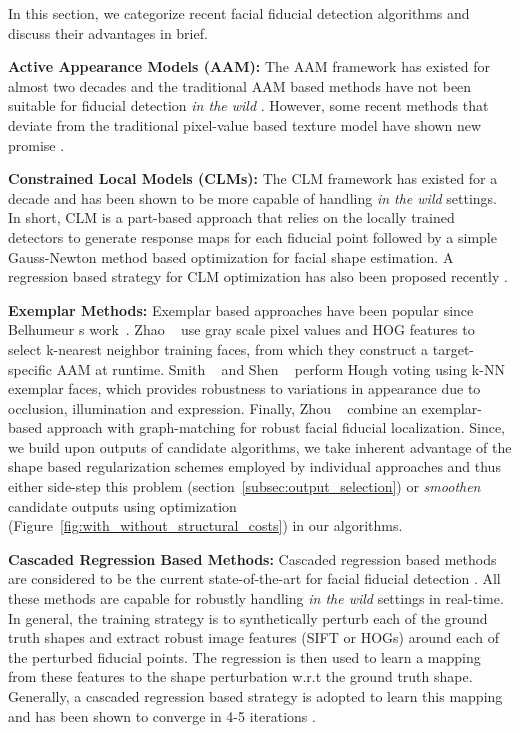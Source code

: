 \label{sec:related_work}

In this section, we categorize recent facial fiducial detection algorithms and discuss their advantages in brief.

\textbf{Active Appearance Models (AAM):}
The AAM framework has existed for almost two decades \cite{edwa_tayl_coot1998,Baker03} and the traditional AAM based
methods have not been suitable for fiducial detection \emph{in the wild} \cite{Saragih_PR2009,gross2005generic}. However, some recent methods that deviate from the traditional 
pixel-value based texture model have shown new promise \cite{antonakos2014hog,asthana_pami_2015}.   

\textbf{Constrained Local Models (CLMs):}
The CLM framework has existed for a decade \cite{Cristinacce2006,Saragih2011_1} and has been shown
to be more
capable of handling \emph{in the wild} settings. In short, CLM is a part-based approach that relies on the
locally trained detectors to generate response maps for each fiducial point followed by a simple Gauss-Newton
method based optimization \cite{Saragih2011_1} for facial shape estimation. A regression based strategy for CLM
optimization has also been proposed recently \cite{akshay_CVPR_2013}.

\textbf{Exemplar Methods:}
Exemplar based approaches have been popular since Belhumeur \etal \textquotesingle s
work~\cite{kumarPAMI13_faceExem}. Zhao \etal~\cite{zhaoACCV12_AAM} use gray scale pixel values and HOG features
to select k-nearest neighbor training faces, from which they construct a target-specific AAM at
runtime. Smith \etal~\cite{smithCVPR14_Context} and Shen \etal~\cite{shenCVPR13_retrieval} perform Hough voting
using k-NN exemplar faces, which provides
robustness to variations in appearance due to occlusion, illumination and expression. Finally,
Zhou \etal~\cite{zhouICCV13_EGM} combine an exemplar-based approach with graph-matching for robust facial fiducial 
localization. Since, we build upon outputs of candidate algorithms, we take inherent advantage
of the shape based regularization schemes employed by individual approaches and thus either side-step
this problem (section~\ref{subsec:output_selection}) or \emph{smoothen} candidate outputs using
optimization (Figure~\ref{fig:with_without_structural_costs}) in our algorithms.

\textbf{Cascaded Regression Based Methods:}
Cascaded regression based methods are considered to be the current state-of-the-art for facial fiducial detection
\cite{xiongCVPR13_SDM,asthanaCVPR14_Chehra,6909614,Tzimiropoulos_2015_CVPR,CaoWWS12}. All these methods are capable for 
robustly handling \emph{in the wild} settings in real-time. In general, the training strategy is to synthetically perturb each of the ground truth
shapes and extract robust image features (SIFT or HOGs) around each of the perturbed fiducial points. The regression
is then used to learn a mapping from these features to the shape perturbation w.r.t the ground truth shape.
Generally, a cascaded regression based strategy is adopted to learn this mapping and has been shown to converge
in 4-5 iterations \cite{xiongCVPR13_SDM,asthanaCVPR14_Chehra}.  

